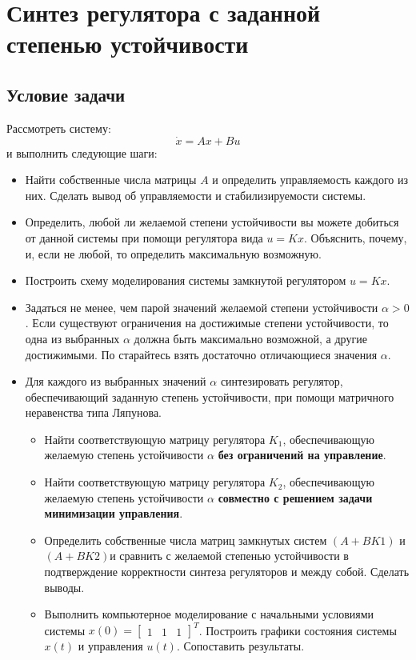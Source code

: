 \chapter{Синтез регулятора с заданной степенью устойчивости}
\label{ch:chap1}
\section{Условие задачи}

Рассмотреть систему:
$$
  \dot{x} = Ax + Bu
$$ и выполнить следующие шаги:

\begin{itemize}
\item   Найти собственные числа матрицы $A$ и определить управляемость каждого из них. 
Сделать вывод об управляемости и стабилизируемости системы.
\item Определить, любой ли желаемой степени устойчивости вы можете добиться от
данной системы при помощи регулятора вида $u = Kx$. Объяснить, почему, и, если не любой, то определить максимальную возможную.
\item Построить схему моделирования системы замкнутой регулятором $u = Kx$.
\item Задаться не менее, чем парой значений желаемой степени устойчивости $\alpha > 0$.
Если существуют ограничения на достижимые степени устойчивости, то одна из
выбранных $\alpha$ должна быть максимально возможной, а другие достижимыми. По
старайтесь взять достаточно отличающиеся значения $\alpha$.
\item Для каждого из выбранных значений $\alpha$ синтезировать регулятор, обеспечивающий заданную степень устойчивости, 
при помощи матричного неравенства типа Ляпунова.
  \begin{itemize}
    \item Найти соответствующую матрицу регулятора $K_1$, обеспечивающую желаемую степень устойчивости $\alpha$ \textbf{без ограничений на управление}.
    \item Найти соответствующую матрицу регулятора $K_2$, обеспечивающую желаемую степень устойчивости $\alpha$ \textbf{совместно с решением задачи минимизации управления}.
    \item  Определить собственные числа матриц замкнутых систем $(A+BK1)$ и $(A+BK2)$и сравнить с желаемой степенью устойчивости 
    в подтверждение корректности синтеза регуляторов и между собой. Сделать выводы.
    \item Выполнить компьютерное моделирование с начальными условиями системы 
    $x(0) = \begin{bmatrix} 1&1&1 \end{bmatrix}^T$. Построить  графики состояния системы $x(t)$ и управления $u(t)$. Сопоставить результаты.

\end{itemize}
\end{itemize}
